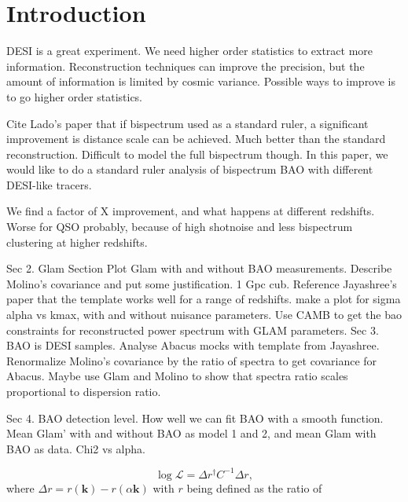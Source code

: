 \section{Introduction}
\label{sec:introduction}

DESI is a great experiment. We need higher order statistics to extract more information. Reconstruction techniques can improve the precision, but the amount of information is limited by cosmic variance. Possible ways to improve is to go higher order statistics. 

Cite Lado's paper that if bispectrum used as a standard ruler, a significant improvement is distance scale can be achieved. Much better than the standard reconstruction. Difficult to model the full bispectrum though. In this paper, we would like to do a standard ruler analysis of bispectrum BAO with different DESI-like tracers. 

We find a factor of X improvement, and what happens at different redshifts. Worse for QSO probably, because of high shotnoise and less bispectrum clustering at higher redshifts. 


Sec 2. Glam Section
Plot Glam with and without BAO measurements.
Describe Molino's covariance and put some justification. 1 Gpc cub.
Reference Jayashree's paper that the template works well for a range of redshifts. make a plot for sigma alpha vs kmax, with and without nuisance parameters.
Use CAMB to get the bao constraints for reconstructed power spectrum with GLAM parameters.
Sec 3. BAO is DESI samples. Analyse Abacus mocks with template from Jayashree. Renormalize Molino's covariance by the ratio of spectra to get covariance for Abacus. Maybe use Glam and Molino to show that spectra ratio scales proportional to dispersion ratio.

Sec 4. BAO detection level. How well we can fit BAO with a smooth function. Mean Glam' with and without BAO as model 1 and 2, and mean Glam with BAO as data. Chi2 vs alpha.



\begin{equation}
\log \mathcal{L} = \Delta r^{\dagger} C^{-1} \Delta r,
\end{equation}
where $\Delta r = r(\textbf{k}) - r(\alpha \textbf{k})$ with $r$ being defined as the ratio of




